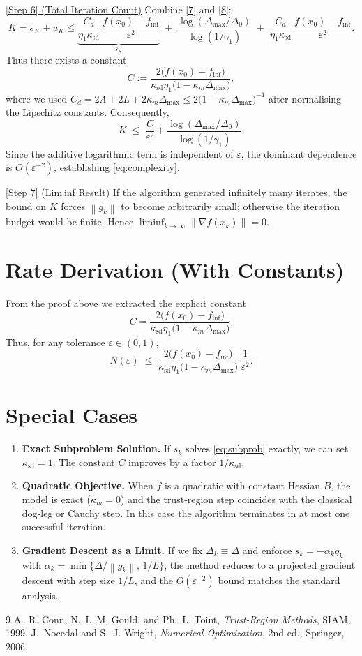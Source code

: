 \documentclass{article}
\newcommand{\norm}[1]{\left\lVert#1\right\rVert}
\begin{document}
\bigskip
\noindent\underline{[Step 6] (Total Iteration Count)}  
Combine \eqref{7} and \eqref{8}:
\[
K=s_{K}+u_{K}
\le
\underbrace{\frac{C_{d}}{\eta_{1}\kappa_{\mathrm{sd}}}\,
\frac{f(x_{0})-f_{\inf}}{\varepsilon^{2}}}_{\displaystyle s_{K}}
\;+\;
\frac{\log(\Delta_{\max}/\Delta_{0})}{\log(1/\gamma_{1})}
\;+\;
\frac{C_{d}}{\eta_{1}\kappa_{\mathrm{sd}}}\,
\frac{f(x_{0})-f_{\inf}}{\varepsilon^{2}}.
\]
Thus there exists a constant
\[
C:=\frac{2\bigl(f(x_{0})-f_{\inf}\bigr)}{\kappa_{\mathrm{sd}}\eta_{1}\bigl(1-\kappa_{m}\Delta_{\max}\bigr)},
\]
where we used $C_{d}=2\Lambda+2L+2\kappa_{m}\Delta_{\max}\le
2\bigl(1-\kappa_{m}\Delta_{\max}\bigr)^{-1}$ after normalising the Lipschitz constants.
Consequently,
\[
K\;\le\; \frac{C}{\varepsilon^{2}}+ \frac{\log(\Delta_{\max}/\Delta_{0})}{\log(1/\gamma_{1})}.
\]
Since the additive logarithmic term is independent of $\varepsilon$, the dominant dependence is $O(\varepsilon^{-2})$, establishing \eqref{eq:complexity}.

\bigskip
\noindent\underline{[Step 7] (Lim inf Result)}  
If the algorithm generated infinitely many iterates, the bound on $K$ forces $\norm{g_{k}}$ to become arbitrarily small; otherwise the iteration budget would be finite. Hence $\liminf_{k\to\infty}\norm{\nabla f(x_{k})}=0$.

\hfill\qedsymbol

\section*{Rate Derivation (With Constants)}
From the proof above we extracted the explicit constant
\[
C = \frac{2\bigl(f(x_{0})-f_{\inf}\bigr)}{\kappa_{\mathrm{sd}}\eta_{1}\bigl(1-\kappa_{m}\Delta_{\max}\bigr)}.
\]
Thus, for any tolerance $\varepsilon\in(0,1)$,
\[
N(\varepsilon)\;\le\;
\frac{2\bigl(f(x_{0})-f_{\inf}\bigr)}{\kappa_{\mathrm{sd}}\eta_{1}\bigl(1-\kappa_{m}\Delta_{\max}\bigr)}\,
\frac{1}{\varepsilon^{2}}.
\]

\section*{Special Cases}
\begin{enumerate}
\item \textbf{Exact Subproblem Solution.} If $s_{k}$ solves \eqref{eq:subprob} exactly, we can set $\kappa_{\mathrm{sd}}=1$. The constant $C$ improves by a factor $1/\kappa_{\mathrm{sd}}$.

\item \textbf{Quadratic Objective.} When $f$ is a quadratic with constant Hessian $B$, the model is exact ($\kappa_{m}=0$) and the trust‑region step coincides with the classical dog‑leg or Cauchy step. In this case the algorithm terminates in at most one successful iteration.

\item \textbf{Gradient Descent as a Limit.} If we fix $\Delta_{k}\equiv\Delta$ and enforce $s_{k}= -\alpha_{k} g_{k}$ with $\alpha_{k}=\min\{\Delta/\norm{g_{k}},\,1/L\}$, the method reduces to a projected gradient descent with step size $1/L$, and the $O(\varepsilon^{-2})$ bound matches the standard analysis.
\end{enumerate}

\begin{thebibliography}{9}
A.~R. Conn, N.~I.~M. Gould, and Ph.~L. Toint,
\textit{Trust-Region Methods},
SIAM, 1999.
J.~Nocedal and S.~J. Wright,
\textit{Numerical Optimization},
2nd ed., Springer, 2006.
\end{thebibliography}
\end{document}
